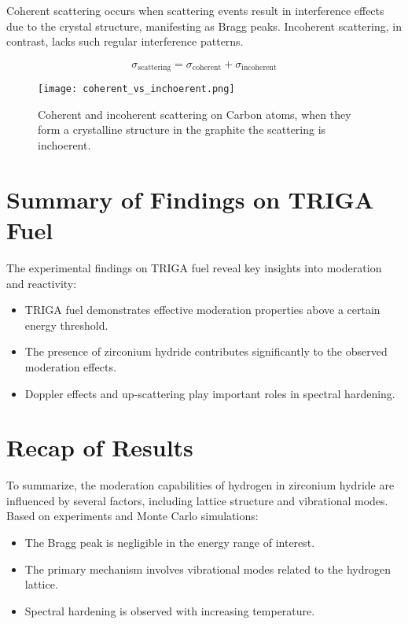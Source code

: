 Coherent scattering occurs when scattering events result in interference effects due to the crystal structure, manifesting as Bragg peaks. Incoherent scattering, in contrast, lacks such regular interference patterns.

\begin{equation}
    \sigma_{\text{scattering}} = \sigma_{\text{coherent}} + \sigma_{\text{incoherent}}
\end{equation}

\begin{figure}[h]
    \centering
    \texttt{[image: coherent\_vs\_inchoerent.png]}
    \caption{Coherent and incoherent scattering on Carbon atoms, when they form a crystalline structure in the graphite the scattering is inchoerent.}
\end{figure}

\section{Summary of Findings on TRIGA Fuel}

The experimental findings on TRIGA fuel reveal key insights into moderation and reactivity:

\begin{itemize}
    \item TRIGA fuel demonstrates effective moderation properties above a certain energy threshold.
    \item The presence of zirconium hydride contributes significantly to the observed moderation effects.
    \item Doppler effects and up-scattering play important roles in spectral hardening.
\end{itemize}

\section{Recap of Results}

To summarize, the moderation capabilities of hydrogen in zirconium hydride are influenced by several factors, including lattice structure and vibrational modes. Based on experiments and Monte Carlo simulations:

\begin{itemize}
    \item The Bragg peak is negligible in the energy range of interest.
    \item The primary mechanism involves vibrational modes related to the hydrogen lattice.
    \item Spectral hardening is observed with increasing temperature.
\end{itemize}

